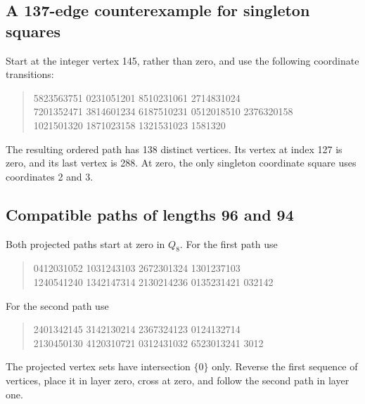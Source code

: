 \documentclass[11pt,a4paper]{article}
\theoremstyle{definition}
\theoremstyle{remark}
\newcommand{\Q}{Q}
\begin{document}
\subsection{A 137-edge counterexample for singleton squares}\label{app:square-counterexample}
Start at the integer vertex 145, rather than zero, and use the following coordinate transitions:
\begin{quote}\small{} 5823563751 0231051201 8510231061 2714831024\\
7201352471 3814601234 6187510231 0512018510 2376320158\\
1021501320 1871023158 1321531023 1581320
\end{quote}
The resulting ordered path has 138 distinct vertices. Its vertex at index 127 is zero, and its last vertex is 288. At zero, the only singleton coordinate square uses coordinates 2 and 3.

\subsection{Compatible paths of lengths 96 and 94}\label{app:joint-seed}
Both projected paths start at zero in $\Q_8$. For the first path use
\begin{quote}\small{} 0412031052 1031243103 2672301324 1301237103\\
1240541240 1342147314 2130214236 0135231421 032142
\end{quote}
For the second path use
\begin{quote}\small{} 2401342145 3142130214 2367324123 0124132714\\
2130450130 4120310721 0312431032 6523013241 3012
\end{quote}
The projected vertex sets have intersection $\{0\}$ only. Reverse the first sequence of vertices, place it in layer zero, cross at zero, and follow the second path in layer one.
\end{document}
